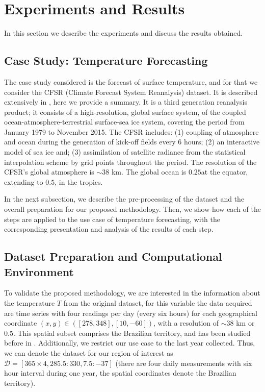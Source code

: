 \section{Experiments and Results}

In this section we describe the experiments and discuss the results obtained.

\subsection{Case Study: Temperature Forecasting}

The case study considered is the forecast of surface temperature, and for that we consider the CFSR (Climate Forecast System Reanalysis) dataset. It is described extensively in \cite{Saha2010}, here we provide a summary. It is a third generation reanalysis product; it consists of a high-resolution, global surface system, of the coupled ocean-atmosphere-terrestrial surface-sea ice system, covering the period from January 1979 to November 2015. The CFSR includes: (1) coupling of atmosphere and ocean during the generation of kick-off fields every 6 hours; (2) an interactive model of sea ice and; (3) assimilation of satellite radiance from the statistical interpolation scheme by grid points throughout the period. The resolution of the CFSR's global atmosphere is $\sim 38$ km. The global ocean is $0.25$\textdegree at the equator, extending to $0.5$\textdegree, in the tropics. 

In the next subsection, we describe the pre-processing of the dataset and the overall preparation for our proposed methodology. Then, we show how each of the steps are applied to the use case of temperature forecasting, with the corresponding presentation and analysis of the results of each step.

\subsection{Dataset Preparation and Computational Environment}
\label{sec:DatasetPreparation}

To validate the proposed methodology, we are interested in the information about the temperature $T$ from the original dataset, for this variable the data acquired are time series with four readings per day (every six hours) for each geographical coordinate $(x,y)\in ([278, 348], [10, -60])$, with a resolution of $\sim 38$ km or $0.5$\textdegree. This spatial subset comprises the Brazilian territory, and has been studied before in \cite{Souto2018}. Additionally, we restrict our use case to the last year collected. Thus, we can denote the dataset for our region of interest as $\mathcal{D} = [ 365\times 4, 285.5:330, 7.5:-37]$ (there are four daily measurements with six hour interval during one year, the spatial coordinates denote the Brazilian territory). 

